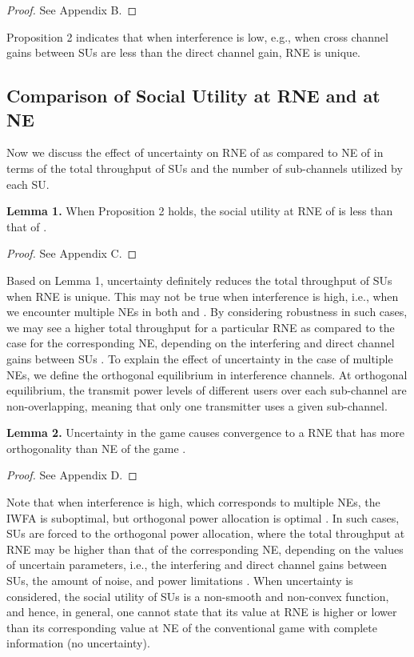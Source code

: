 \documentclass[peerreview,onecolumn,11pt,draftclsnofoot]{IEEEtran}\usepackage{amsmath}\usepackage{amsfonts}\usepackage{epsfig}\usepackage{amssymb}\usepackage{graphicx}\usepackage{amssymb,amsmath}\usepackage{cite}\usepackage{color,soul}\newcommand\T{\rule{0pt}{3.1ex}}
\begin{document}
\begin{proof}
See Appendix B.
\end{proof}
Proposition 2 indicates that when interference is low, e.g., when cross channel gains between SUs are less than the direct channel gain, RNE is unique.

\subsection{Comparison of Social Utility at RNE and at NE}

Now we discuss the effect of uncertainty on RNE of
 as compared to NE of  in
terms of the total throughput of SUs and the number of
sub-channels utilized by each SU.

\textbf{Lemma 1.} When Proposition 2 holds, the social utility at RNE of  is less than that of
.
\begin{proof}
See Appendix C.
\end{proof}

Based on Lemma 1, uncertainty definitely reduces the total
throughput of SUs when RNE is unique. This may not be
true when interference is high, i.e., when we encounter multiple NEs in both  and . By considering robustness in such cases, we may see a higher total throughput for a particular RNE as compared to the case for the corresponding NE, depending on the interfering and direct channel gains between SUs \cite{ProbabilisticIWFA,Robustnew}.
To explain the effect of uncertainty in the case of multiple NEs, we define the orthogonal equilibrium in interference channels. At orthogonal equilibrium, the transmit power levels of different users over each sub-channel are non-overlapping, meaning that only one transmitter uses a given sub-channel.

\textbf{Lemma 2.} Uncertainty in the game  causes convergence to a RNE that has more orthogonality than NE of the game .

\begin{proof}
See Appendix D.
\end{proof}

Note that when interference is high, which corresponds to multiple NEs, the IWFA is suboptimal, but orthogonal power allocation is optimal \cite{SimultanousWFA,Spectrumsharing}. In such cases, SUs are forced to the orthogonal power allocation, where the total throughput at RNE may be higher than that of the corresponding NE, depending on the values of uncertain parameters, i.e., the interfering and direct channel gains between SUs, the amount of noise, and power limitations \cite{ProbabilisticIWFA,Robustnew}. When uncertainty is considered, the social utility of SUs is a non-smooth and non-convex function, and hence, in general, one cannot state that its value at RNE is higher or lower than its corresponding value at NE of the conventional game with complete information (no uncertainty).
\end{document}
